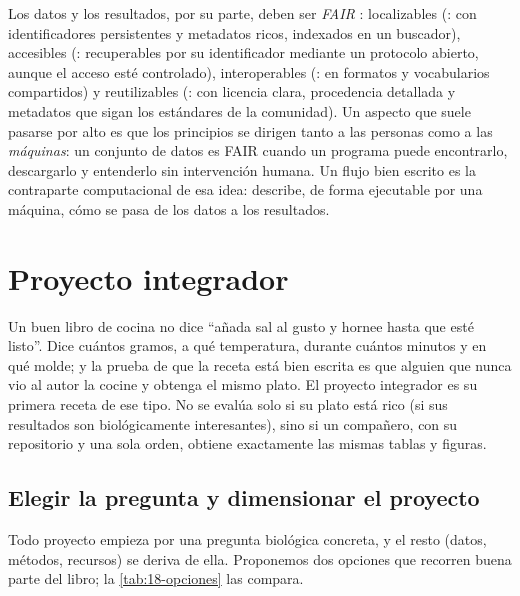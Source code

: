 Los datos y los resultados, por su parte, deben ser \emph{FAIR} \parencite{c18-wilkinson2016}: localizables (: con identificadores persistentes y metadatos ricos, indexados en un buscador), accesibles (: recuperables por su identificador mediante un protocolo abierto, aunque el acceso esté controlado), interoperables (: en formatos y vocabularios compartidos) y reutilizables (: con licencia clara, procedencia detallada y metadatos que sigan los estándares de la comunidad). Un aspecto que suele pasarse por alto es que los principios se dirigen tanto a las personas como a las \emph{máquinas}: un conjunto de datos es FAIR cuando un programa puede encontrarlo, descargarlo y entenderlo sin intervención humana. Un flujo bien escrito es la contraparte computacional de esa idea: describe, de forma ejecutable por una máquina, cómo se pasa de los datos a los resultados.

\section{Proyecto integrador}\label{sec:18-proyecto}

\begin{intuicion}
Un buen libro de cocina no dice ``añada sal al gusto y hornee hasta que esté listo''. Dice cuántos gramos, a qué temperatura, durante cuántos minutos y en qué molde; y la prueba de que la receta está bien escrita es que alguien que nunca vio al autor la cocine y obtenga el mismo plato. El proyecto integrador es su primera receta de ese tipo. No se evalúa solo si su plato está rico (si sus resultados son biológicamente interesantes), sino si un compañero, con su repositorio y una sola orden, obtiene exactamente las mismas tablas y figuras.
\end{intuicion}

\subsection{Elegir la pregunta y dimensionar el proyecto}

Todo proyecto empieza por una pregunta biológica concreta, y el resto (datos, métodos, recursos) se deriva de ella. Proponemos dos opciones que recorren buena parte del libro; la \cref{tab:18-opciones} las compara.

